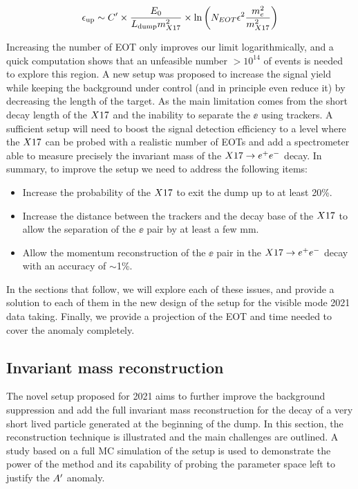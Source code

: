 \begin{equation}
  \label{eq:x17-coverage}
  \epsilon_{\textrm{up}} \sim C' \times \frac{E_0}{L_{\textrm{dump}}m^2_{X17}} \times \ln{\left(N_{EOT} \epsilon^2 \frac{m_e^2}{m_{X17}^2}\right)}
\end{equation}

Increasing the number of EOT only improves our limit logarithmically, and a quick computation shows that an unfeasible number $>10^{14}$ of events is needed to explore this region. A new setup was proposed to increase the signal yield while keeping the background under control (and in principle even reduce it) by decreasing the length of the target. As the main limitation comes from the short decay length of the $X17$ and the inability to separate the $\ee$ using trackers. A sufficient setup will need to boost the signal detection efficiency to a level where the $X17$ can be probed with a realistic number of EOTs and add a spectrometer able to measure precisely the invariant mass of the $X17 \rightarrow e^+ e^-$ decay. In summary, to improve the setup we need to address the following items:

\begin{itemize}
\item Increase the probability of the $X17$ to exit the dump up to at least 20\%.
\item Increase the distance between the trackers and the decay base of the $X17$ to allow the separation of the $\ee$ pair by at least a few mm.
\item Allow the momentum reconstruction of the $\ee$ pair in the $X17 \rightarrow e^+ e^-$ decay with an accuracy of $\sim$1\%.
\end{itemize}

In the sections that follow, we will explore each of these issues, and provide a solution to each of them in the new design of the setup for the visible mode 2021 data taking.  Finally, we provide a projection of the EOT and time needed to cover the anomaly completely.

\subsection{Invariant mass reconstruction}
\label{ch5:sec:new-vismode-setup-invmass}

The novel setup proposed for 2021 aims to further improve the background suppression and add the full invariant mass reconstruction for the decay of a very short lived particle generated at the beginning of the dump. In this section, the reconstruction technique is illustrated and the main challenges are outlined. A study based on a full MC simulation of the setup is used to demonstrate the power of the method and its capability of probing the parameter space left to justify the $A'$ anomaly.

